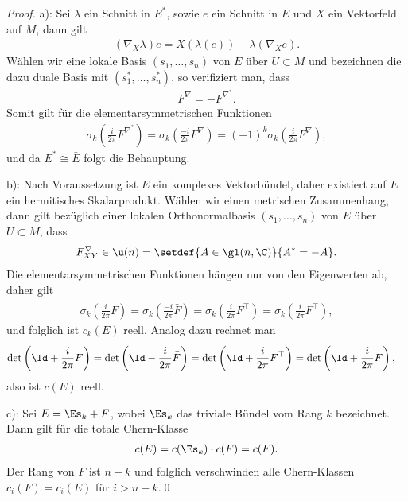 \documentclass[%
	paper=a5,%
	fleqn,%
	DIV=18,%
	BCOR=0mm,
	fontsize=11pt,
	titlepage=false,%
	bibliography=totoc,
	DIV=18,%
	twoside=true,
	pdftitle=Riemannsche Geometrie,
	pdfauthor=Uwe Semmelmann,
	numbers=noendperiod]%
	{scrbook}
\begin{document}
\begin{proof}
a): Sei $\lambda$ ein Schnitt in $E^*$, sowie $e$ ein Schnitt in $E$ und $X$ ein Vektorfeld auf $M$, dann gilt
\begin{align*}
(\nabla_{X}\lambda)e = X(\lambda( e)) - \lambda(\nabla_{X}e).
\end{align*}
Wählen wir eine lokale Basis $(s_{1},\ldots,s_{n})$ von $E$ über $U\subset M$ und bezeichnen die dazu duale Basis mit $(s_{1}^*,\ldots,s_{n}^*)$, so verifiziert man, dass
\begin{align*}
F^\nabla = -F^{\nabla^*}.
\end{align*}
Somit gilt für die elementarsymmetrischen Funktionen
\begin{align*}
\sigma_{k}\left(\frac{i}{2\pi}F^{\nabla^*}\right)
= 
\sigma_{k}\left(\frac{-i}{2\pi}F^{\nabla}\right)
= (-1)^k
\sigma_{k}\left(\frac{i}{2\pi}F^{\nabla}\right),
\end{align*}
und da $E^*\cong \bar{E}$ folgt die Behauptung.

b): Nach Voraussetzung ist $E$ ein komplexes Vektorbündel, daher existiert auf $E$ ein hermitisches Skalarprodukt. Wählen wir einen metrischen Zusammenhang, dann gilt bezüglich einer lokalen Orthonormalbasis $(s_{1},\ldots,s_{n})$ von $E$ über $U\subset M$, dass
\begin{align*}
F_{XY}^\nabla \in \u(n) = \setdef{A\in\gl(n,\C)}{A^* = -A}.
\end{align*}
Die elementarsymmetrischen Funktionen hängen nur von den Eigenwerten ab, daher gilt
\begin{align*}
\bar{\sigma_{k}\left(\frac{i}{2\pi}F\right)} = 
\sigma_{k}\left(\frac{-i}{2\pi}\bar{F}\right)
= 
\sigma_{k}\left(\frac{i}{2\pi}F^\top\right) = 
\sigma_{k}\left(\frac{i}{2\pi}F^\top\right),
\end{align*}
und folglich ist $c_{k}(E)$ reell. Analog dazu rechnet man
\begin{align*}
\bar{\det\left(\Id + \frac{i}{2\pi}F\right)}
&= 
\det\left(\Id - \frac{i}{2\pi}\bar{F}\right)
=
\det\left(\Id + \frac{i}{2\pi}F^\top\right)
= 
\det\left(\Id + \frac{i}{2\pi}F\right),
\end{align*}
also ist $c(E)$ reell.

c): Sei $E= \Es_{k}+F$, wobei $\Es_k$ das triviale Bündel vom Rang $k$ bezeichnet. Dann gilt für die totale Chern-Klasse
\begin{align*}
c(E) = c(\Es_{k})\cdot c(F) = c(F).
\end{align*}
Der Rang von $F$ ist $n-k$ und folglich verschwinden alle Chern-Klassen $c_{i}(F)=c_{i}(E)$ für $i>n-k$.\qed
\end{proof}
\end{document}

